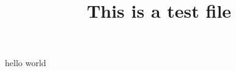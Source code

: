 \documentclass{article}
\begin{document}
\title{This is a test file}

hello world\cite{rongtian:method}


\end{document}
